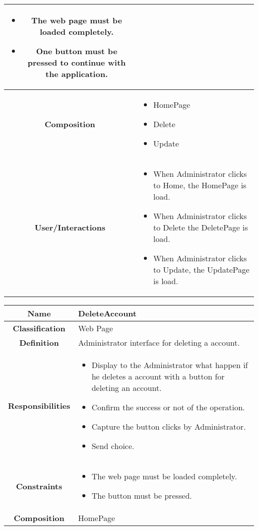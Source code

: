 \documentclass[11pt, a4paper,titlepage]{article}
\begin{document}
\begin{enumerate}
\begin{tabularx}{\textwidth}{| c | X |}
\begin{itemize}
		\item  The web page must be loaded completely.
		\item One button must be pressed to continue with the application.
	\end{itemize}
	\\
	\hline
	\textbf{Composition} &
	\begin{itemize}
		\item HomePage
		\item Delete
		\item Update
	\end{itemize}
	\\
	\hline
	\textbf{User/Interactions} &
	\begin{itemize}
		\item When Administrator clicks to Home, the HomePage is load.    	
		\item When Administrator clicks to Delete the DeletePage is load.    	
		\item When Administrator clicks to Update, the UpdatePage is load.
	\end{itemize}
	\\
	\hline 
\end{tabularx}
\begin{tabularx}{\textwidth}{| c | X |}
	\hline
	\textbf{Name} &
	DeleteAccount
	\\
	\hline
	\textbf{Classification} &
	Web Page
	\\
	\hline
	\textbf{Definition} &
	Administrator interface for deleting a account.\\
	\hline
	\textbf{Responsibilities} &
	\begin{itemize}
		\item Display to the Administrator what happen if he deletes a account with a button for deleting an account.
		\item Confirm the success or not of the operation.
		\item Capture the button clicks by Administrator.
		\item Send choice.
	\end{itemize}
	\\
	\hline
	\textbf{Constraints} &
	\begin{itemize}
		\item  The web page must be loaded completely.
		\item The button must be pressed.
	\end{itemize}
	\\
	\hline
	\textbf{Composition} & HomePage

\end{tabularx}
\end{enumerate}
\end{document}
